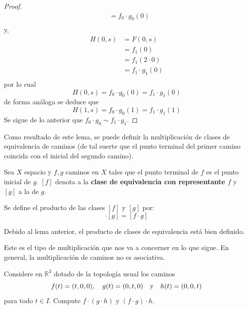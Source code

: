 \documentclass[12pt]{report}
\theoremstyle{largebreak}
\begin{document}
\begin{proof}
\begin{equation*}
\begin{split}
                &=f_0\cdot g_0(0)\\
            \end{split}
        \end{equation*}
        y,
        \begin{equation*}
            \begin{split}
                H(0,s)&=F(0,s)\\
                &=f_1(0)\\
                &=f_1(2\cdot0)\\
                &=f_1\cdot g_1(0)\\
            \end{split}
        \end{equation*}
        por lo cual
        \begin{equation*}
            H(0,s)=f_0\cdot g_0(0)=f_1\cdot g_1(0)
        \end{equation*}
        de forma análoga se deduce que
        \begin{equation*}
            H(1,s)=f_0\cdot g_0(1)=f_1\cdot g_1(1)
        \end{equation*}
        Se sigue de lo anterior que $f_0\cdot g_0\sim f_1\cdot g_1$.
    \end{proof}

    Como resultado de este lema, se puede definir la multiplicación de clases de equivalencia de caminos (de tal suerte que el punto terminal del primer camino coincida con el inicial del segundo camino).
    
    \begin{mydef}
        Sea $X$ espacio y $f,g$ caminos en $X$ tales que el punto terminal de $f$ es el punto inicial de $g$. $\left[f\right]$ denota a la \textbf{clase de equivalencia con representante $f$} y $\left[g\right]$ a la de $g$.

        Se define el producto de las clases $[f]$ y $[g]$ por:
        \begin{equation*}
            [f]\cdot[g]=[f\cdot g]
        \end{equation*}
    \end{mydef}

    Debido al lema anterior, el producto de clases de equivalencia está bien definido.

    Este es el tipo de multiplicación que nos va a concerner en lo que sigue. En general, la multiplicación de caminos no es asociativa.

    \begin{excer}
        Considere en $\mathbb{R}^3$ dotado de la topología usual los caminos
        \begin{equation*}
            f(t)=(t,0,0),\quad g(t)=(0,t,0)\quad\textup{y}\quad h(t)=(0,0,t)
        \end{equation*}
        para todo $t\in I$. Compute $f\cdot (g\cdot h)$ y $(f\cdot g)\cdot h$.
    \end{excer}
\end{document}
